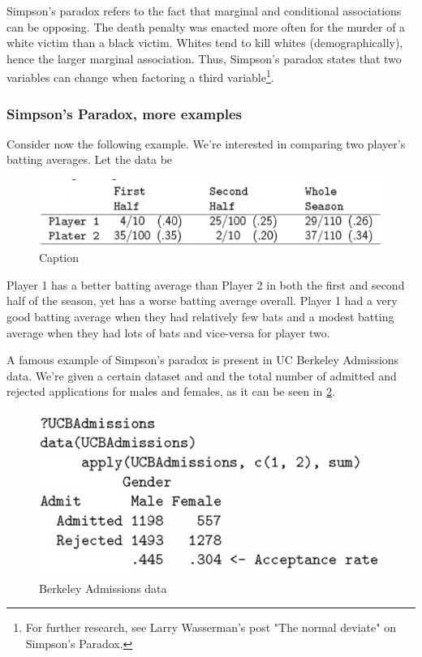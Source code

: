 \documentclass{homework}
\begin{document}
Simpson's paradox refers to the fact that marginal and conditional associations can be opposing. The death penalty was enacted more often for the murder of a white victim than a black victim. Whites tend to kill whites (demographically), hence the larger marginal association. Thus, Simpson's paradox states that two variables can change when factoring a third variable\footnote{For further research, see Larry Wasserman's post "The normal deviate" on Simpson's Paradox.}. 

\subsubsection{Simpson's Paradox, more examples}

Consider now the following example. We're interested in comparing two player's batting averages. Let the data be 

\begin{figure}
    \centering
    \includegraphics[scale=.5]{figs/data points_week4_part2.png}
    \caption{Caption}
    \label{fig: Data groups}
\end{figure}

Player 1 has a better batting average than Player 2 in both the first and second half of the season, yet has a worse batting average overall.  Player 1 had a very good batting average when they had relatively few bats and a modest batting average when they had lots of bats and vice-versa for player two. 

A famous example of Simpson's paradox is present in UC Berkeley Admissions data. We're given a certain dataset and and the total number of admitted and rejected applications for males and females, as it can be seen in \ref{fig: Data group ucb}.

\begin{figure}
    \centering
    \includegraphics[scale=.5]{figs/data points_week4_part3.png}
    \caption{Berkeley Admissions data}
    \label{fig: Data group ucb}
\end{figure}
\end{document}

